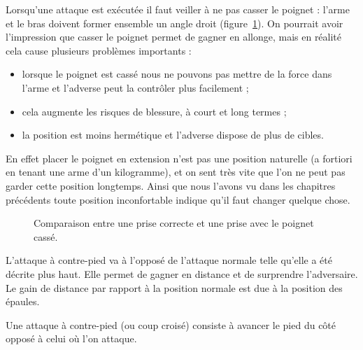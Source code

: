 Lorsqu'une attaque est exécutée il faut veiller à ne pas casser le poignet : l'arme et le bras doivent former ensemble un angle droit (figure~\ref{attdef:fig:poignet-cassé}).
On pourrait avoir l'impression que casser le poignet permet de gagner en allonge, mais en réalité cela cause plusieurs problèmes importants :
\begin{itemize}
	\item lorsque le poignet est cassé nous ne pouvons pas mettre de la force dans l'arme et l'adverse peut la contrôler plus facilement ;
	
	\item cela augmente les risques de blessure, à court et long termes ;
	
	\item la position est moins hermétique et l'adverse dispose de plus de cibles.
\end{itemize}
En effet placer le poignet en extension n'est pas une position naturelle (a fortiori en tenant une arme d'un kilogramme), et on sent très vite que l'on ne peut pas garder cette position longtemps.
Ainsi que nous l'avons vu dans les chapitres précédents toute position inconfortable indique qu'il faut changer quelque chose.


\begin{figure}[ht]
	\centering
	\hspace{3cm}
	\caption{Comparaison entre une prise correcte et une prise avec le poignet cassé.}
	\label{attdef:fig:poignet-cassé}
\end{figure}


L'attaque à contre-pied va à l'opposé de l'attaque normale telle qu'elle a été décrite plus haut.
Elle permet de gagner en distance et de surprendre l'adversaire.
Le gain de distance par rapport à la position normale est due à la position des épaules.

\begin{coup}
	\label{struct:coup:contre-pied}

	Une attaque à contre-pied (ou coup croisé) consiste à avancer le pied du côté opposé à celui où l'on attaque.
\end{coup}



